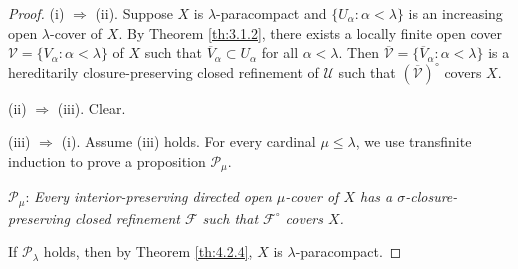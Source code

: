 \documentclass[jisng7iii.tex]{subfiles}
\begin{document}
\begin{proof}
(i) $\Rightarrow$ (ii).
 Suppose $X$ is $\lambda$-paracompact and $\{U_\alpha: \alpha < \lambda\}$ is 
 an increasing open $\lambda$-cover of $X$. By Theorem \ref{th:3.1.2}, 
 there exists  a locally finite open cover $\mathscr{V}=\{V_\alpha: \alpha < \lambda\}$ 
 of $X$ such that $\overline{V}_\alpha\subset U_\alpha$ for all $\alpha < \lambda$.
 Then $\overline{\mathscr{V}} = \{\overline{V}_\alpha: \alpha < \lambda\}$
 is a hereditarily closure-preserving closed refinement of $\mathscr{U}$ 
 such that $(\overline{\mathscr{V}})^\circ$ covers $X$.

(ii) $\Rightarrow$ (iii). Clear.

 (iii) $\Rightarrow$ (i). Assume (iii) holds. 
 For every cardinal $\mu \le \lambda$,
 we use transfinite induction to prove a proposition  $\mathcal{P}_\mu$.
 
 $\mathcal{P}_\mu$: \textit{Every interior-preserving directed 
 open $\mu$-cover of $X$ has a $\sigma$-closure-preserving  closed refinement 
 $\mathscr{F}$ such that  $\mathscr{F}^\circ$ covers $X$.}
 
 If $\mathcal{P}_\lambda$ holds, 
 then by Theorem \ref{th:4.2.4},  $X$ is $\lambda$-paracompact.
 

\end{proof}
\end{document}
